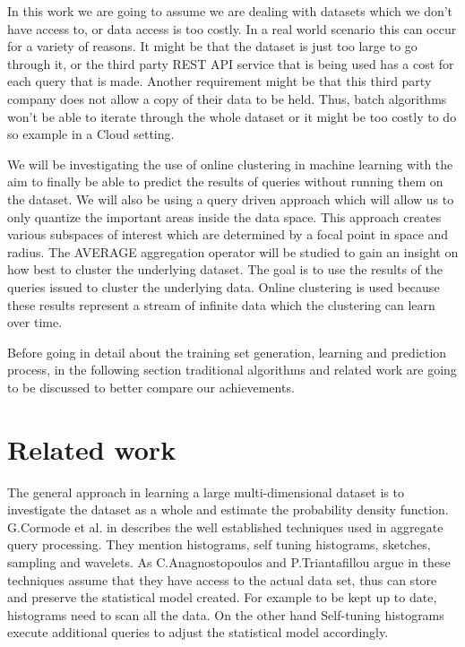 \documentclass{lmproj}
\begin{document}
In this work we are going to assume we are dealing with datasets which we don't have access to, or data access is too costly. In a real world scenario this can occur for a variety of reasons. It might be that the dataset is just too large to go through it, or the third party REST API service that is being used has a cost for each query that is made. Another requirement might be that this third party company does not allow a copy of their data to be held. Thus, batch algorithms won't be able to iterate through the whole dataset or it might be too costly to do so example in a Cloud setting. 

We will be investigating the use of online clustering in machine learning with the aim to finally be able to predict the results of queries without running them on the dataset. We will also be using a query driven approach \cite{LearningDNN} which will allow us to only quantize the important areas inside the data space. This approach creates various subspaces of interest  which are determined by a focal point in space and radius. The AVERAGE aggregation operator will be studied to gain an insight on how best to cluster the underlying dataset. The goal is to use the results of the queries issued to cluster the underlying data. Online clustering is used because these results represent a stream of infinite data which the clustering can learn over time.

Before going in detail about the training set generation, learning and prediction process, in the following section traditional algorithms and related work are going to be discussed to better compare our achievements.

\chapter{Related work}
\label{relatedWork}
The general approach in learning a large multi-dimensional dataset is to investigate the dataset as a whole and estimate the probability density function. G.Cormode et al. in \cite{Synopses} describes the well established techniques used in aggregate query processing. They mention histograms, self tuning histograms, sketches, sampling and wavelets. As C.Anagnostopoulos and P.Triantafillou argue in \cite{learningCount} these techniques assume that they have access to the actual data set, thus can store and preserve the statistical model created. For example to be kept up to date, histograms need to scan all the data. On the other hand Self-tuning histograms execute additional queries to adjust the statistical model accordingly.
\end{document}
